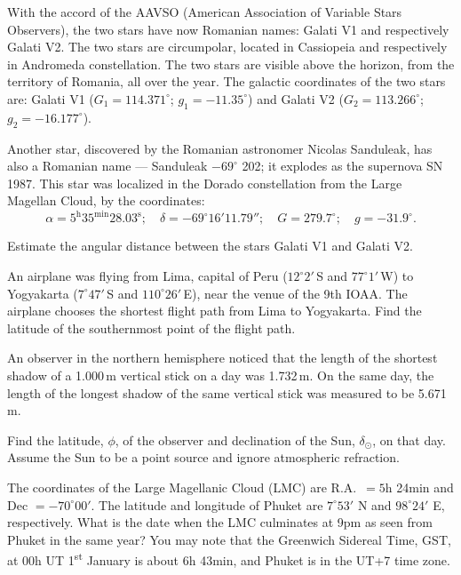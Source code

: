 With the accord of the AAVSO (American Association of Variable Stars
Observers), the two stars have now Romanian names: Galati V1 and respectively
Galati V2. The two stars are circumpolar, located in Cassiopeia and
respectively in Andromeda constellation. The two stars are visible above the
horizon, from the territory of Romania, all over the year. The galactic
coordinates of the two stars are: Galati V1 ($G_1 = 114.371^\circ$;
$g_1 = -11.35^\circ$) and Galati V2 ($G_2 = 113.266^\circ$;
$g_2 = -16.177^\circ$).

Another star, discovered by the Romanian astronomer Nicolas Sanduleak, has
also a Romanian name --- Sanduleak $-69^\circ$ 202; it explodes as the
supernova SN 1987. This star was localized in the Dorado constellation from
the Large Magellan Cloud, by the coordinates:
\[
\alpha = 5^{\mathrm{h}}35^{\mathrm{min}}28.03^{\mathrm{s}};\quad
\delta = -69^\circ 16' 11.79'';\quad
G = 279.7^\circ;\quad
g = -31.9^\circ.
\]

Estimate the angular distance between the stars Galati V1 and Galati V2.

An airplane was flying from Lima, capital of Peru ($12^\circ 2'$\,S and
$77^\circ 1'$\,W) to Yogyakarta ($7^\circ 47'$\,S and $110^\circ 26'$\,E),
near the venue of the 9th IOAA. The airplane chooses the shortest flight path
from Lima to Yogyakarta. Find the latitude of the southernmost point of the
flight path.

An observer in the northern hemisphere noticed that the length of the shortest
shadow of a 1.000\,m vertical stick on a day was 1.732\,m. On the same day,
the length of the longest shadow of the same vertical stick was measured to be
5.671\,m.

Find the latitude, $\phi$, of the observer and declination of the Sun,
$\delta_\odot$, on that day. Assume the Sun to be a point source and ignore
atmospheric refraction.

The coordinates of the Large Magellanic Cloud (LMC) are R.A.\ $= 5$h 24min and
Dec $= -70^\circ 00'$. The latitude and longitude of Phuket are $7^\circ 53'$ N
and $98^\circ 24'$ E, respectively. What is the date when the LMC culminates at
9pm as seen from Phuket in the same year? You may note that the Greenwich
Sidereal Time, GST, at 00h UT 1\textsuperscript{st} January is about 6h 43min,
and Phuket is in the UT+7 time zone.

